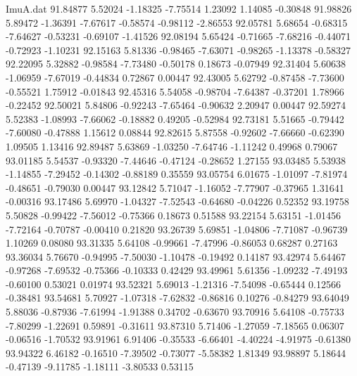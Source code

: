 \begin{filecontents}{ImuA.dat}
  91.84877    5.52024   -1.18325   -7.75514    1.23092    1.14085   -0.30848
  91.98826    5.89472   -1.36391   -7.67617   -0.58574   -0.98112   -2.86553
  92.05781    5.68654   -0.68315   -7.64627   -0.53231   -0.69107   -1.41526
  92.08194    5.65424   -0.71665   -7.68216   -0.44071   -0.72923   -1.10231
  92.15163    5.81336   -0.98465   -7.63071   -0.98265   -1.13378   -0.58327
  92.22095    5.32882   -0.98584   -7.73480   -0.50178    0.18673   -0.07949
  92.31404    5.60638   -1.06959   -7.67019   -0.44834    0.72867    0.00447
  92.43005    5.62792   -0.87458   -7.73600   -0.55521    1.75912   -0.01843
  92.45316    5.54058   -0.98704   -7.64387   -0.37201    1.78966   -0.22452
  92.50021    5.84806   -0.92243   -7.65464   -0.90632    2.20947    0.00447
  92.59274    5.52383   -1.08993   -7.66062   -0.18882    0.49205   -0.52984
  92.73181    5.51665   -0.79442   -7.60080   -0.47888    1.15612    0.08844
  92.82615    5.87558   -0.92602   -7.66660   -0.62390    1.09505    1.13416
  92.89487    5.63869   -1.03250   -7.64746   -1.11242    0.49968    0.79067
  93.01185    5.54537   -0.93320   -7.44646   -0.47124   -0.28652    1.27155
  93.03485    5.53938   -1.14855   -7.29452   -0.14302   -0.88189    0.35559
  93.05754    6.01675   -1.01097   -7.81974   -0.48651   -0.79030    0.00447
  93.12842    5.71047   -1.16052   -7.77907   -0.37965    1.31641   -0.00316
  93.17486    5.69970   -1.04327   -7.52543   -0.64680   -0.04226    0.52352
  93.19758    5.50828   -0.99422   -7.56012   -0.75366    0.18673    0.51588
  93.22154    5.63151   -1.01456   -7.72164   -0.70787   -0.00410    0.21820
  93.26739    5.69851   -1.04806   -7.71087   -0.96739    1.10269    0.08080
  93.31335    5.64108   -0.99661   -7.47996   -0.86053    0.68287    0.27163
  93.36034    5.76670   -0.94995   -7.50030   -1.10478   -0.19492    0.14187
  93.42974    5.64467   -0.97268   -7.69532   -0.75366   -0.10333    0.42429
  93.49961    5.61356   -1.09232   -7.49193   -0.60100    0.53021    0.01974
  93.52321    5.69013   -1.21316   -7.54098   -0.65444    0.12566   -0.38481
  93.54681    5.70927   -1.07318   -7.62832   -0.86816    0.10276   -0.84279
  93.64049    5.88036   -0.87936   -7.61994   -1.91388    0.34702   -0.63670
  93.70916    5.64108   -0.75733   -7.80299   -1.22691    0.59891   -0.31611
  93.87310    5.71406   -1.27059   -7.18565    0.06307   -0.06516   -1.70532
  93.91961    6.91406   -0.35533   -6.66401   -4.40224   -4.91975   -0.61380
  93.94322    6.46182   -0.16510   -7.39502   -0.73077   -5.58382    1.81349
  93.98897    5.18644   -0.47139   -9.11785   -1.18111   -3.80533    0.53115

\end{filecontents}
